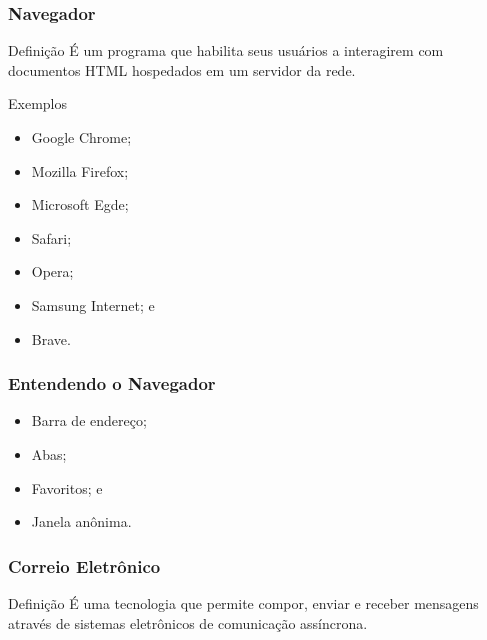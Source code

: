 \documentclass[aspectratio=169]{beamer} %
\begin{document}
\begin{frame}
	\frametitle{Navegador}
	
	\begin{block}{Defini\c cão}
		É um programa que habilita seus usuários a interagirem com documentos HTML hospedados em um servidor da rede.
	\end{block} \vfill
	
	\begin{exampleblock}{Exemplos}
		\begin{itemize}
			\item Google Chrome;
			\item Mozilla Firefox;
			\item Microsoft Egde;
			\item Safari;
			\item Opera;
			\item Samsung Internet; e
			\item Brave.
		\end{itemize}
	\end{exampleblock}
\end{frame}

\begin{frame}
	\frametitle{Entendendo o Navegador}
	
	\begin{itemize}
		\item Barra de endereço;
		\item Abas;
		\item Favoritos; e
		\item Janela anônima.
	\end{itemize}
\end{frame}

\begin{frame}
	\frametitle{Correio Eletrônico}
	
	\begin{block}{Defini\c cão}
		É uma tecnologia que permite compor, enviar e receber mensagens através de sistemas eletrônicos de comunicação assíncrona.
	\end{block}
\end{frame}
\end{document}
